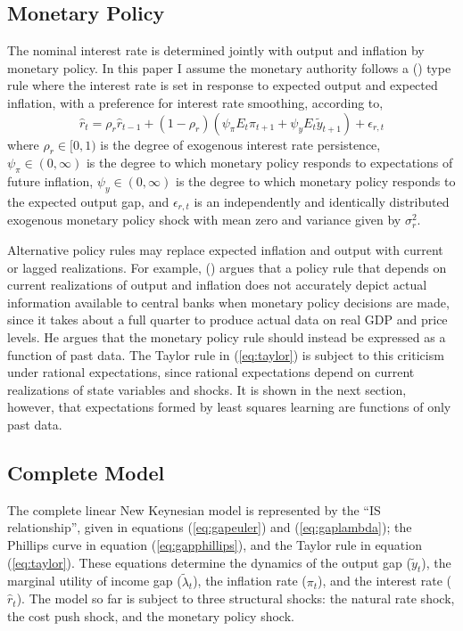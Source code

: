 \documentclass[10pt]{article}
\newcommand{\beq}{\begin{equation}}
\newcommand{\eeq}{\end{equation}}
\newcommand{\citee}[1]{\citeauthor*{#1} (\citeyear{#1})}
\newcommand{\h}[1]{\hat{#1}}
\begin{document}
\subsection{Monetary Policy}
The nominal interest rate is determined jointly with output and inflation by monetary policy.  In this paper I assume the monetary authority follows a \citee{taylor1993} type rule where the interest rate is set in response to expected output and expected inflation, with a preference for interest rate smoothing, according to,
\beq \label{eq:taylor} \h{r}_t = \rho_r \h{r}_{t-1} + (1-\rho_r) \left(\psi_{\pi} E_t \pi_{t+1} + \psi_y E_t \tilde{y}_{t+1} \right) + \epsilon_{r,t} \eeq
where $\rho_r \in [0,1)$ is the degree of exogenous interest rate persistence, $\psi_{\pi} \in (0,\infty)$ is the degree to which monetary policy responds to expectations of future inflation, $\psi_y \in (0,\infty)$ is the degree to which monetary policy responds to the expected output gap, and $\epsilon_{r,t}$ is an independently and identically distributed exogenous monetary policy shock with mean zero and variance given by $\sigma_r^2$.  

Alternative policy rules may replace expected inflation and output with current or lagged realizations.  For example, \citee{mccallum1997} argues that a policy rule that depends on current realizations of output and inflation does not accurately depict actual information available to central banks when monetary policy decisions are made, since it takes about a full quarter to produce actual data on real GDP and price levels.  He argues that the monetary policy rule should instead be expressed as a function of past data.  The Taylor rule in (\ref{eq:taylor}) is subject to this criticism under rational expectations, since rational expectations depend on current realizations of state variables and shocks.  It is shown in the next section, however, that expectations formed by least squares learning are functions of only past data.

\subsection{Complete Model}
The complete linear New Keynesian model is represented by the ``IS relationship'', given in equations (\ref{eq:gapeuler}) and (\ref{eq:gaplambda}); the Phillips curve in equation (\ref{eq:gapphillips}), and the Taylor rule in equation (\ref{eq:taylor}).  These equations determine the dynamics of the output gap ($\tilde{y}_t$), the marginal utility of income gap ($\tilde{\lambda}_t$), the inflation rate ($\pi_t$), and the interest rate ($\h{r}_t$).  The model so far is subject to three structural shocks: the natural rate shock, the cost push shock, and the monetary policy shock.
\end{document}
